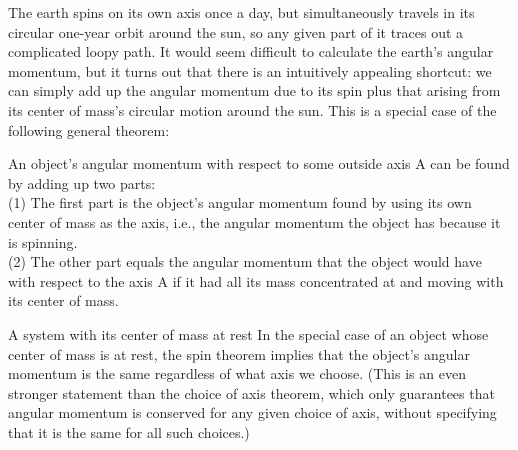 The earth spins on its own axis once a day, but simultaneously
travels in its circular one-year orbit around the sun, so
any given part of it traces out a complicated loopy path. It
would seem difficult to calculate the earth's angular
momentum, but it turns out that there is an intuitively
appealing shortcut: we can simply add up the angular
momentum due to its spin plus that arising from its center
of mass's circular motion around the sun. This is a special
case of the following general theorem:

\begin{lessimportant}
An object's angular momentum with respect to some outside
axis A can be found by adding up two parts:\\
(1) The first part is the object's angular momentum
found by using its own center of mass as the axis, i.e., the
angular momentum the object has because it is spinning.\\
(2) The other part equals the angular momentum that the object
would have with respect to the axis A if it had all its mass
concentrated at and moving with its center of mass.
\end{lessimportant}


\begin{eg}{A system with its center of mass at rest}
In the special case of an object whose center of mass is at
rest, the spin theorem implies that the object's angular
momentum is the same regardless of what axis we choose.
(This is an even stronger statement than the choice of axis
theorem, which only guarantees that angular momentum is
conserved for any given choice of axis, without specifying
that it is the same for all such choices.)
\end{eg}



